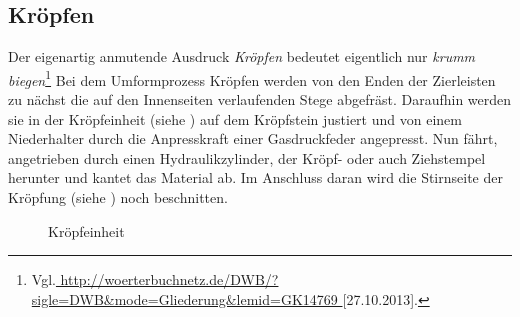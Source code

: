 \documentclass[12pt,a4paper,parskip]{scrartcl}
\begin{document}
{\subsection{Kröpfen \label{sec:kropf}}
Der eigenartig anmutende Ausdruck \emph{Kröpfen} bedeutet eigentlich nur \emph{krumm biegen}\footnote{Vgl.\url{
http://woerterbuchnetz.de/DWB/?sigle=DWB&mode=Gliederung&lemid=GK14769
}[27.10.2013].}
Bei dem Umformprozess Kröpfen werden von den  Enden der Zierleisten zu nächst die auf den Innenseiten verlaufenden Stege  abgefräst.  Daraufhin werden sie in der Kröpfeinheit (siehe ) auf dem Kröpfstein justiert und von einem Niederhalter durch die Anpresskraft einer Gasdruckfeder angepresst. Nun fährt, angetrieben durch einen Hydraulikzylinder, der Kröpf- oder auch Ziehstempel herunter und kantet das Material ab. Im Anschluss daran wird die Stirnseite der Kröpfung (siehe ) noch beschnitten.
\begin{figure}[!htb]
\centering
\hfill
{}
\hfill
{}
\hfill
\caption{Kröpfeinheit }
\label{fig:kropfeinheit}
\end{figure}

}
\end{document}
